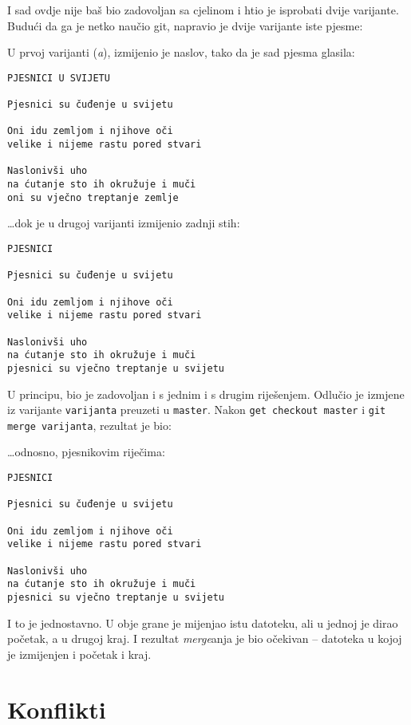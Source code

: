 I sad ovdje nije baš bio zadovoljan sa cjelinom i htio je isprobati dvije varijante.
Budući da ga je netko naučio git, napravio je dvije varijante iste pjesme:



U prvoj varijanti (\emph a), izmijenio je naslov, tako da je sad pjesma glasila:

\begin{verbatim}
PJESNICI U SVIJETU

Pjesnici su čuđenje u svijetu

Oni idu zemljom i njihove oči
velike i nijeme rastu pored stvari

Naslonivši uho
na ćutanje sto ih okružuje i muči
oni su vječno treptanje zemlje
\end{verbatim}

\dots{}dok je u drugoj varijanti izmijenio zadnji stih:

\begin{verbatim}
PJESNICI

Pjesnici su čuđenje u svijetu

Oni idu zemljom i njihove oči
velike i nijeme rastu pored stvari

Naslonivši uho
na ćutanje sto ih okružuje i muči
pjesnici su vječno treptanje u svijetu
\end{verbatim}

U principu, bio je zadovoljan i s jednim i s drugim riješenjem.
Odlučio je izmjene iz varijante \verb+varijanta+ preuzeti u \verb+master+.
Nakon \verb+get checkout master+ i \verb+git merge varijanta+, rezultat je bio:



\dots{}odnosno, pjesnikovim riječima:

\begin{verbatim}
PJESNICI

Pjesnici su čuđenje u svijetu

Oni idu zemljom i njihove oči
velike i nijeme rastu pored stvari

Naslonivši uho
na ćutanje sto ih okružuje i muči
pjesnici su vječno treptanje u svijetu
\end{verbatim}

I to je jednostavno.
U obje grane je mijenjao istu datoteku, ali u jednoj je dirao početak, a u drugoj kraj.
I rezultat \emph{merge}anja je bio očekivan -- datoteka u kojoj je izmijenjen i početak i kraj.

\section*{Konflikti}

